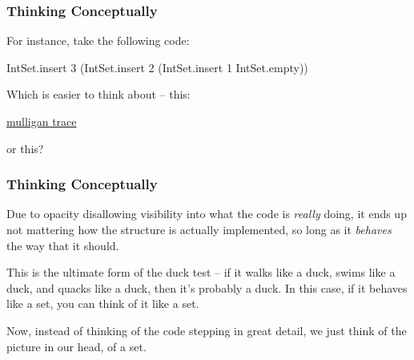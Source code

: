\documentclass[aspectratio=169, handout]{beamer}
\begin{document}
\begin{frame}[fragile]
  \frametitle{Thinking Conceptually}

  For instance, take the following code:

  \pause
  \vspace{\fill}

  {\small
  \begin{codeblock}
    IntSet.insert 3 (IntSet.insert 2 (IntSet.insert 1 IntSet.empty))
  \end{codeblock}
  }

  \pause
  \vspace{\fill}

  Which is easier to think about -- this:

  \begin{center}
    {\color{blue} \href{https://asciinema.org/a/x3HwtfZyK6TYkDQ9eA1NztuVR}{mulligan trace}
    }
  \end{center}

  \pause
  or this?

  \begin{center}
  \end{center}
\end{frame}

\begin{frame}[fragile]
  \frametitle{Thinking Conceptually}

  Due to opacity disallowing visibility into what the code is \textit{really}
  doing, it ends up not mattering how the structure is actually implemented,
  so long as it \textit{behaves} the way that it should.

  \pause
  \vspace{\fill}

  This is the ultimate form of the duck test -- if it walks like a duck,
  swims like a duck, and quacks like a duck, then it's probably a duck. In this
  case, if it behaves like a set, you can think of it like a set.\footnotemark

  \pause
  \vspace{\fill}

  Now, instead of thinking of the code stepping in great detail, we just
  think of the picture in our head, of a set.
\end{frame}
\end{document}
